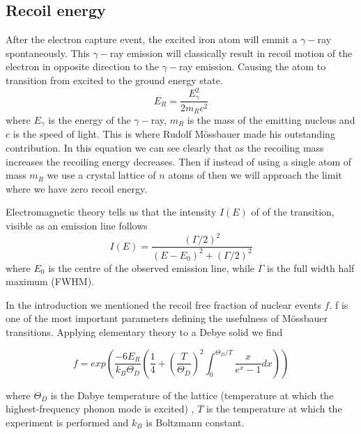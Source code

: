 \documentclass[a4paper, twocolumn]{article}
\begin{document}
\subsection{Recoil energy}
After the electron capture event, the excited iron atom will emmit a $\gamma-$ray spontaneously. This $\gamma-$ray emission will classically result in recoil motion of the electron in opposite direction to the $\gamma-$ray emission. Causing the atom to transition from excited to the ground energy state\cite{2}.
\begin{equation} E_R = \frac{E_{\gamma}^2}{2 m_R c^2}
\end{equation}
where $E_{\gamma}$ is the energy of the $\gamma-$ray, $m_R$ is the mass of the emitting nucleus and $c$ is the speed of light.
This is where Rudolf Mössbauer made his outstanding contribution. In this equation we can see clearly that as the recoiling mass increases the recoiling energy decreases. Then if instead of using a single atom of mass $m_R$ we use a crystal lattice of $n$ atoms of then we will approach the limit where we have zero recoil energy\cite{2}.

Electromagnetic theory tells us that the intensity $I(E)$ of of the transition, visible as an emission line follows
\begin{equation} I(E) = \frac{(\Gamma / 2)^2}{(E - E_0)^2 + (\Gamma /2)^2}
\end{equation}
where $E_0$ is the centre of the observed emission line, while $\Gamma$ is the full width half maximum (FWHM).

In the introduction we mentioned the recoil free fraction of nuclear events $f$.
f is one of the most important parameters defining the usefulness of Mössbauer transitions\cite{8}.
Applying elementary theory to a Debye solid we find

\begin{equation} 
f = exp \left (\frac{-6 E_R}{k_B \Theta_D} \left (\frac{1}{4} + \left (\frac{T}{\Theta_D} \right)^2  \int_{0}^{\Theta_{D}/T} \frac{x}{e^x -1}dx \right )\right )
\end{equation}


where $\Theta_D$ is the Dabye temperature of the lattice (temperature at which the highest-frequency phonon mode is excited) \cite{13}, $T$ is the temperature at which the experiment is performed\cite{0} and $k_B$ is Boltzmann constant.
\end{document}
